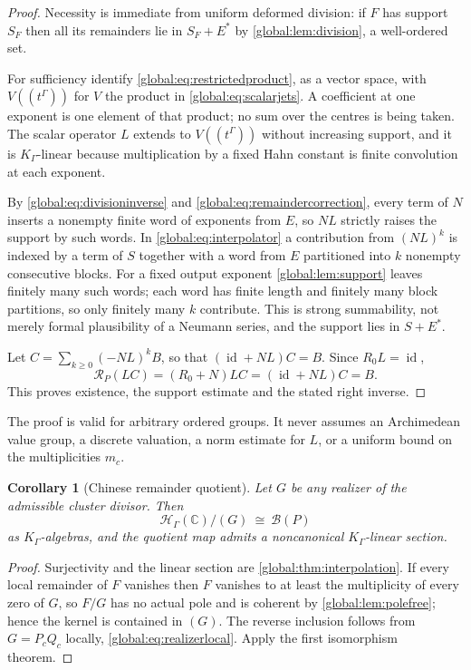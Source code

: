 \documentclass[11pt,letterpaper]{article}
\newtheorem{corollary}[corollary]{Corollary}
\theoremstyle{definition}
\theoremstyle{remark}
\newcommand{\C}{\mathbb C}
\newcommand{\HH}{\mathscr H_\Gamma}
\newcommand{\KK}{K_\Gamma}
\newcommand{\id}{\operatorname{id}}
\newcommand{\jet}{\mathcal R}
\newcommand{\BB}{\mathscr B(P)}
\numberwithin{equation}{section}
\begin{document}
\begin{proof}
Necessity is immediate from uniform deformed division: if $F$ has support $S_F$ then all its remainders lie in $S_F+E^*$ by \cref{global:lem:division}, a well-ordered set.

For sufficiency identify \eqref{global:eq:restrictedproduct}, as a vector space, with $V((t^\Gamma))$ for $V$ the product in \eqref{global:eq:scalarjets}. A coefficient at one exponent is one element of that product; no sum over the centres is being taken. The scalar operator $L$ extends to $V((t^\Gamma))$ without increasing support, and it is $\KK$-linear because multiplication by a fixed Hahn constant is finite convolution at each exponent.

By \eqref{global:eq:divisioninverse} and \eqref{global:eq:remaindercorrection}, every term of $N$ inserts a nonempty finite word of exponents from $E$, so $NL$ strictly raises the support by such words. In \eqref{global:eq:interpolator} a contribution from $(NL)^k$ is indexed by a term of $S$ together with a word from $E$ partitioned into $k$ nonempty consecutive blocks. For a fixed output exponent \cref{global:lem:support} leaves finitely many such words; each word has finite length and finitely many block partitions, so only finitely many $k$ contribute. This is strong summability, not merely formal plausibility of a Neumann series, and the support lies in $S+E^*$.

Let $C=\sum_{k\ge0}(-NL)^kB$, so that $(\id+NL)C=B$. Since $R_0L=\id$,
\[
  \jet_P(LC)=(R_0+N)LC=(\id+NL)C=B .
\]
This proves existence, the support estimate and the stated right inverse.
\end{proof}

The proof is valid for arbitrary ordered groups. It never assumes an Archimedean value group, a discrete valuation, a norm estimate for $L$, or a uniform bound on the multiplicities $m_c$.

\begin{corollary}[Chinese remainder quotient]\label{global:cor:CRT}
Let $G$ be any realizer of the admissible cluster divisor. Then
\begin{equation}\label{global:eq:CRT}
  \HH(\C)/(G)\ \cong\ \BB
\end{equation}
as $\KK$-algebras, and the quotient map admits a noncanonical $\KK$-linear section.
\end{corollary}

\begin{proof}
Surjectivity and the linear section are \cref{global:thm:interpolation}. If every local remainder of $F$ vanishes then $F$ vanishes to at least the multiplicity of every zero of $G$, so $F/G$ has no actual pole and is coherent by \cref{global:lem:polefree}; hence the kernel is contained in $(G)$. The reverse inclusion follows from $G=P_cQ_c$ locally, \eqref{global:eq:realizerlocal}. Apply the first isomorphism theorem.
\end{proof}
\end{document}
